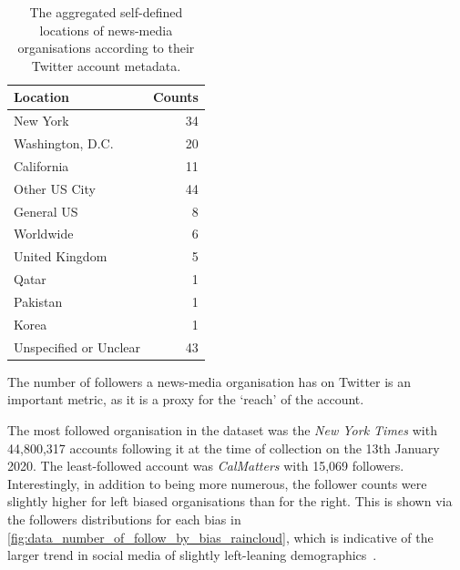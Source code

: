 \begin{table}[!htbp]
	\centering
	\begin{tabular}{lr}
		\toprule
		Location &  Counts \\
		\midrule
		New York &      34 \\
		Washington, D.C. &      20 \\
		California &      11 \\
		Other US City &      44 \\
		General US &       8 \\
		Worldwide &       6 \\
		United Kingdom &       5 \\
		Qatar &       1 \\
		Pakistan &       1 \\
		Korea  &       1 \\
		Unspecified or Unclear &      43 \\
		\bottomrule
	\end{tabular}
	\caption{The aggregated self-defined locations of news-media organisations according to their Twitter account metadata. }
	\label{tab:data_locations}
\end{table}

The number of followers a news-media organisation has on Twitter is an important metric, as it is a proxy for the `reach' of the account.

The most followed organisation in the dataset was the \emph{New York Times} with 44,800,317 accounts following it at the time of collection on the 13th January 2020. The least-followed account was \emph{CalMatters} with 15,069 followers. Interestingly, in addition to being more numerous, the follower counts were slightly higher for left biased organisations than for the right.  This is shown via the followers distributions for each bias in \autoref{fig:data_number_of_follow_by_bias_raincloud}, which is indicative of the larger trend in social media of slightly left-leaning demographics~\cite{mellonTwitterFacebookAre2017}.

